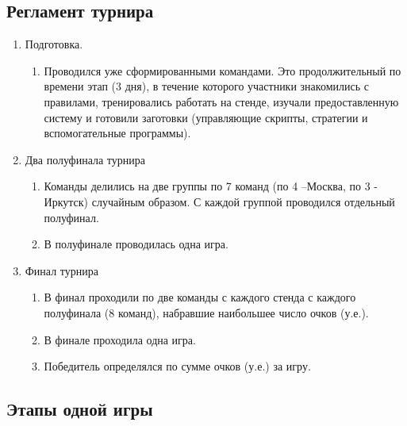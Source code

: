 \subsection*{Регламент турнира}

\begin{enumerate}
    \item Подготовка.
    \begin{enumerate}
        \item Проводился уже сформированными командами. Это продолжительный по времени этап (3 дня), в течение которого участники знакомились с правилами, тренировались работать на стенде, изучали предоставленную систему и готовили заготовки (управляющие скрипты, стратегии и вспомогательные программы).
    \end{enumerate}
    \item Два полуфинала турнира
    \begin{enumerate}
        \item Команды делились на две группы по 7 команд (по 4 –Москва, по 3 - Иркутск) случайным образом. С каждой группой проводился отдельный полуфинал.
        \item В полуфинале проводилась одна игра.
    \end{enumerate}
    \item Финал турнира
    \begin{enumerate}
        \item В финал проходили по две команды с каждого стенда с каждого полуфинала (8 команд), набравшие наибольшее число очков (у.е.). 
        \item В финале проходила одна игра.
        \item Победитель определялся по сумме очков (у.е.) за игру.
    \end{enumerate}
    
\end{enumerate}

\subsection*{Этапы одной игры}


